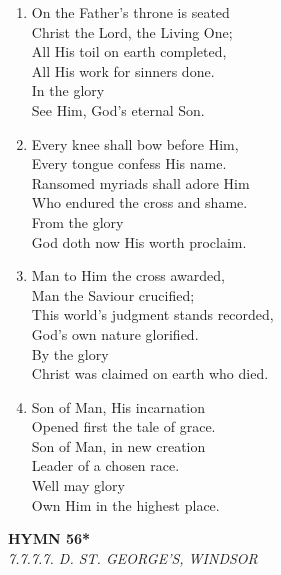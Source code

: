 \documentclass[11pt,a4paper]{article}
\begin{document}
\begin{enumerate}
    \item On the Father's throne is seated \\
        Christ the Lord, the Living One; \\
        All His toil on earth completed, \\
        All His work for sinners done. \\
        In the glory \\
        See Him, God's eternal Son.

    \item Every knee shall bow before Him, \\
        Every tongue confess His name. \\
        Ransomed myriads shall adore Him \\
        Who endured the cross and shame. \\
        From the glory \\
        God doth now His worth proclaim.

    \item Man to Him the cross awarded, \\
        Man the Saviour crucified; \\
        This world's judgment stands recorded, \\
        God's own nature glorified. \\
        By the glory \\
        Christ was claimed on earth who died.

    \item Son of Man, His incarnation \\
        Opened first the tale of grace. \\
        Son of Man, in new creation \\
        Leader of a chosen race. \\
        Well may glory \\
        Own Him in the highest place.

\end{enumerate}

\newpage
\begin{center}
    {\Large \textbf{HYMN 56*}}
    \\
    \textit{7.7.7.7. D. ST. GEORGE'S, WINDSOR}
\end{center}
\vspace{1em}
\end{document}
